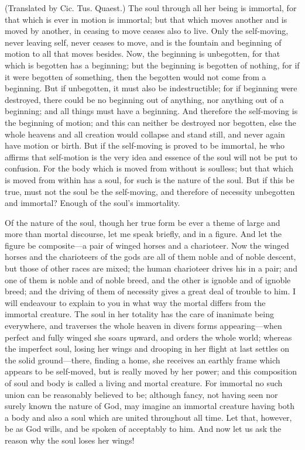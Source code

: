 \documentclass[11pt,letter]{article}
\begin{document}
\par  (Translated by Cic. Tus. Quaest.) The soul through all her being is immortal, for that which is ever in motion is immortal; but that which moves another and is moved by another, in ceasing to move ceases also to live. Only the self-moving, never leaving self, never ceases to move, and is the fountain and beginning of motion to all that moves besides. Now, the beginning is unbegotten, for that which is begotten has a beginning; but the beginning is begotten of nothing, for if it were begotten of something, then the begotten would not come from a beginning. But if unbegotten, it must also be indestructible; for if beginning were destroyed, there could be no beginning out of anything, nor anything out of a beginning; and all things must have a beginning. And therefore the self-moving is the beginning of motion; and this can neither be destroyed nor begotten, else the whole heavens and all creation would collapse and stand still, and never again have motion or birth. But if the self-moving is proved to be immortal, he who affirms that self-motion is the very idea and essence of the soul will not be put to confusion. For the body which is moved from without is soulless; but that which is moved from within has a soul, for such is the nature of the soul. But if this be true, must not the soul be the self-moving, and therefore of necessity unbegotten and immortal? Enough of the soul's immortality.

\par  Of the nature of the soul, though her true form be ever a theme of large and more than mortal discourse, let me speak briefly, and in a figure. And let the figure be composite—a pair of winged horses and a charioteer. Now the winged horses and the charioteers of the gods are all of them noble and of noble descent, but those of other races are mixed; the human charioteer drives his in a pair; and one of them is noble and of noble breed, and the other is ignoble and of ignoble breed; and the driving of them of necessity gives a great deal of trouble to him. I will endeavour to explain to you in what way the mortal differs from the immortal creature. The soul in her totality has the care of inanimate being everywhere, and traverses the whole heaven in divers forms appearing—when perfect and fully winged she soars upward, and orders the whole world; whereas the imperfect soul, losing her wings and drooping in her flight at last settles on the solid ground—there, finding a home, she receives an earthly frame which appears to be self-moved, but is really moved by her power; and this composition of soul and body is called a living and mortal creature. For immortal no such union can be reasonably believed to be; although fancy, not having seen nor surely known the nature of God, may imagine an immortal creature having both a body and also a soul which are united throughout all time. Let that, however, be as God wills, and be spoken of acceptably to him. And now let us ask the reason why the soul loses her wings!
\end{document}
